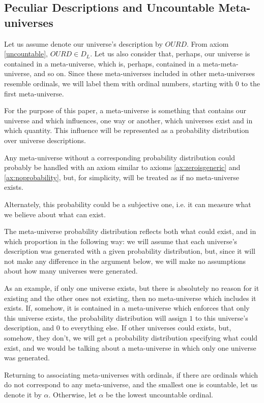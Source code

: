 \documentclass[a4paper
,draft
]{article}
\newcommand{\svn}[2][]{\todo[author=Virgil,color=red!25!white,#1]{#2}}
\def\descriptions{D_L}
\begin{document}
\subsection{Peculiar Descriptions and Uncountable Meta-universes}
\label{fdaumu}
\svn{Use consistent capitalization for section titles.}

Let us assume denote our universe's description by
$OURD$. From axiom \ref{uncountable}, $OURD\in\descriptions$.
Let us also consider that, perhaps, our universe is contained
in a meta-universe, which is, perhaps, contained in
a meta-meta-universe, and so on. Since these meta-universes included in other
meta-universes resemble ordinals, we will label them with ordinal numbers,
starting with $0$ to the first meta-universe.

For the purpose of this paper, a meta-universe is something that contains our
universe and which influences, one way or another, which universes exist and
in which quantity. This influence will be represented as a probability
distribution over universe descriptions.

Any meta-universe without a corresponding probability distribution could
probably be handled with an axiom similar to axioms \ref{ax:zeroisgeneric}
and \ref{ax:noprobability}, but, for simplicity, will be
treated as if no meta-universe exists.

Alternately, this probability could be a subjective one, i.e. it can measure
what we believe about what can exist.

The meta-universe probability distribution reflects both what could exist, and
in which proportion in the following way: we will assume that each universe's
description was generated with a given probability distribution, but, since
it will not make any difference in the argument below, we will make no
assumptions about how many universes were generated.

As an example, if only one universe exists, but there is absolutely no reason
for it existing and the other ones not existing, then no meta-universe which
includes it exists.
If, somehow, it is contained in a meta-universe which
enforces that only this universe exists, the probability distribution will
assign $1$ to this universe's description, and $0$ to everything else.
If other universes could exists, but, somehow, they don't, we will get a
probability distribution specifying what could exist, and we would be talking
about a meta-universe in which only one universe was generated.

Returning to associating meta-universes with ordinals,
if there are ordinals which do not correspond to any meta-universe, and
the smallest one is countable, let us denote it by $\alpha$.
Otherwise, let $\alpha$ be the lowest uncountable ordinal.
\end{document}
